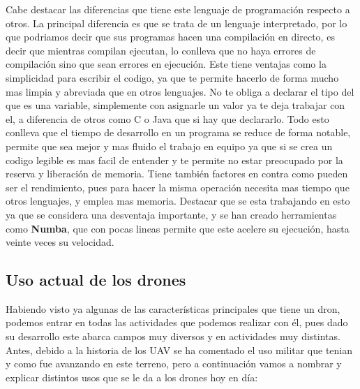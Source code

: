 \documentclass{article}
\begin{document}
	Cabe destacar las diferencias que tiene este lenguaje de programaci\'on respecto a otros. La principal diferencia es que se trata de un lenguaje interpretado, por lo que podriamos decir que sus programas hacen una compilaci\'on en directo, es decir que mientras compilan ejecutan, lo conlleva que no haya errores de compilaci\'on sino que sean errores en ejecuci\'on. Este tiene ventajas como la simplicidad para escribir el codigo, ya que te permite hacerlo de forma mucho mas limpia y abreviada que en otros lenguajes. No te obliga a declarar el tipo del que es una variable, simplemente con asignarle un valor ya te deja trabajar con el, a diferencia de otros como C o Java que si hay que declararlo. Todo esto conlleva que el tiempo de desarrollo en un programa se reduce de forma notable, permite que sea mejor y mas fluido el trabajo en equipo ya que si se crea un codigo legible es mas facil de entender y te permite no estar preocupado por la reserva y liberaci\'on de memoria. Tiene tambi\'en factores en contra como pueden ser el rendimiento, pues para hacer la misma operaci\'on necesita mas tiempo que otros lenguajes, y emplea mas memoria. Destacar que se esta trabajando en esto ya que se considera una desventaja importante, y se han creado herramientas como \textbf{Numba}, que con pocas lineas permite que este acelere su ejecuci\'on, hasta veinte veces su velocidad. 
	

\subsection{Uso actual de los drones}
Habiendo visto ya algunas de las caracter\'isticas principales que tiene un dron, podemos entrar en todas las actividades que podemos realizar con \'el, pues dado su desarrollo este abarca campos muy diversos y en actividades muy distintas. Antes, debido a la historia de los UAV se ha comentado el uso militar que tenian y como fue avanzando en este terreno, pero a continuaci\'on vamos a nombrar y explicar distintos usos que se le da a los drones hoy en d\'ia:
\end{document}
